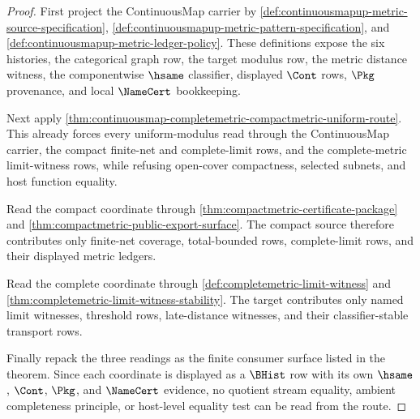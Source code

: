 \begin{proof}
First project the ContinuousMap carrier by
\autoref{def:continuousmapup-metric-source-specification},
\autoref{def:continuousmapup-metric-pattern-specification}, and
\autoref{def:continuousmapup-metric-ledger-policy}. These definitions expose
the six histories, the categorical graph row, the target modulus row, the
metric distance witness, the componentwise $\hsame$ classifier, displayed
$\Cont$ rows, $\Pkg$ provenance, and local $\NameCert$ bookkeeping.

Next apply
\autoref{thm:continuousmap-completemetric-compactmetric-uniform-route}. This
already forces every uniform-modulus read through the ContinuousMap carrier,
the compact finite-net and complete-limit rows, and the complete-metric
limit-witness rows, while refusing open-cover compactness, selected subnets,
and host function equality.

Read the compact coordinate through
\autoref{thm:compactmetric-certificate-package} and
\autoref{thm:compactmetric-public-export-surface}. The compact source
therefore contributes only finite-net coverage, total-bounded rows,
complete-limit rows, and their displayed metric ledgers.

Read the complete coordinate through
\autoref{def:completemetric-limit-witness} and
\autoref{thm:completemetric-limit-witness-stability}. The target contributes
only named limit witnesses, threshold rows, late-distance witnesses, and
their classifier-stable transport rows.

Finally repack the three readings as the finite consumer surface listed in
the theorem. Since each coordinate is displayed as a $\BHist$ row with its
own $\hsame$, $\Cont$, $\Pkg$, and $\NameCert$ evidence, no quotient stream
equality, ambient completeness principle, or host-level equality test can be
read from the route.
\end{proof}

